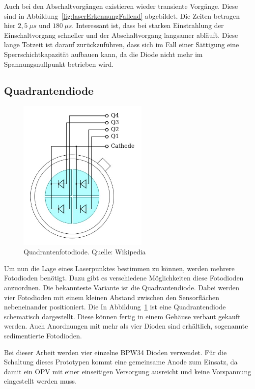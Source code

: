 Auch bei den Abschaltvorgängen existieren wieder transiente Vorgänge.
Diese sind in Abbildung~\ref{fig:laserErkennungFallend} abgebildet.
Die Zeiten betragen hier $2,5~\mu s$ und $180~\mu s$.
Interessant ist, dass bei starken Einstrahlung der Einschaltvorgang schneller und der Abschaltvorgang langsamer abläuft.
Diese lange Totzeit ist darauf zurückzuführen, dass sich im Fall einer Sättigung eine Sperrschichtkapazität aufbauen kann, da die Diode nicht mehr im Spannungsnullpunkt betrieben wird.

\subsection{Quadrantendiode}

\begin{figure} \centering
	\includegraphics[width=2.5in]{img/Wikipedia/QuadrantenFotodiode.jpg}
	\caption{Quadrantenfotodiode. Quelle: Wikipedia \cite{web:quadrantendiode}}
	\label{fig:quadrantendiode}
\end{figure}

Um nun die Lage eines Laserpunktes bestimmen zu können, werden mehrere Fotodioden benötigt.
Dazu gibt es verschiedene Möglichkeiten diese Fotodioden anzuordnen.
Die bekannteste Variante ist die Quadrantendiode.
Dabei werden vier Fotodioden mit einem kleinen Abstand zwischen den Sensorflächen nebeneinander positioniert.
Die 
In Abbildung~\ref{fig:quadrantendiode} ist eine Quadrantendiode schematisch dargestellt.
Diese können fertig in einem Gehäuse verbaut gekauft werden.
Auch Anordnungen mit mehr als vier Dioden sind erhältlich, sogenannte sedimentierte Fotodioden.

Bei dieser Arbeit werden vier einzelne BPW34 Dioden verwendet.
Für die Schaltung dieses Prototypen kommt eine gemeinsame Anode zum Einsatz, da damit ein OPV mit einer einseitigen Versorgung ausreicht und keine Vorspannung eingestellt werden muss.

